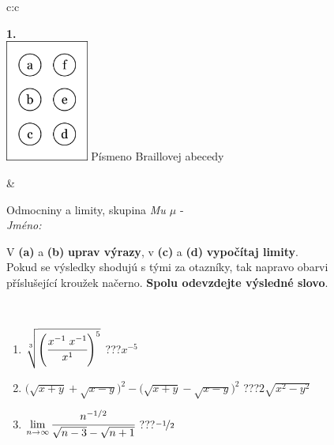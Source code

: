\documentclass[10pt]{report}
\begin{document}
\begin{tabular}{c:c}
\begin{minipage}[c][104.5mm][t]{0.5\linewidth}
\begin{center}
\begin{minipage}{0.20\linewidth}
\begin{center}
{\Huge\bfseries 1.} \\[2mm]
\includegraphics[height=40mm]{../images/braille.png}
{\small Písmeno Braillovej abecedy}
\end{center}
\end{minipage}
\end{center}
\end{minipage}
&
\begin{minipage}[c][104.5mm][t]{0.5\linewidth}
\begin{center}
\vspace{7mm}
{\huge Odmocniny a limity, skupina \textit{Mu $\mu$} -}\\[5mm]
\textit{Jméno:}\phantom{xxxxxxxxxxxxxxxxxxxxxxxxxxxxxxxxxxxxxxxxxxxxxxxxxxxxxxxxxxxxxxxxx}\\[5mm]
\begin{minipage}{0.95\linewidth}
\begin{center}
V \textbf{(a)} a \textbf{(b)} \textbf{uprav výrazy}, v \textbf{(c)} a \textbf{(d)} \textbf{vypočítaj limity}.\\Pokud se výsledky shodujú s tými za otazníky, tak napravo obarvi\\příslušející kroužek načerno. \textbf{Spolu odevzdejte výsledné slovo}.
\end{center}
\end{minipage}
\\[1mm]
\begin{minipage}{0.79\linewidth}
\begin{center}
\begin{varwidth}{\linewidth}
\begin{enumerate}
\small
\item $\sqrt[3]{\left(\cfrac{x^{-1}\;x^{-1}}{x^{1}}\right)^{5}}$\quad \dotfill\; ???\;\dotfill \quad $x^{-5}$
\item {\footnotesize{\scriptsize$\big(\sqrt{x+y}+\sqrt{x-y}\big)^2-\big(\sqrt{x+y}-\sqrt{x-y}\big)^2$}\quad \dotfill\; ???\;\dotfill \quad $2\sqrt{x^2-y^2}$}
\item $\lim\limits_{n\to\infty}\cfrac{n^{-1/2}}{\sqrt{n-3}-\sqrt{n+1}}$\quad \dotfill\; ???\;\dotfill \quad $\nicefrac{-1}{2}$

\end{enumerate}
\end{varwidth}
\end{center}
\end{minipage}
\end{center}
\end{minipage}
\end{tabular}
\end{document}
